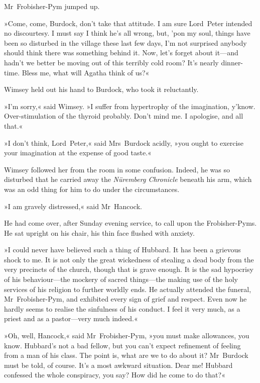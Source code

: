 Mr~Frobisher-Pym jumped up.

»Come, come, Burdock, don't take that attitude. I am sure Lord~Peter intended no discourtesy. I must say I think he's all wrong, but, 'pon my soul, things have been so disturbed in the village these last few days, I'm not surprised anybody should think there was something behind it. Now, let's forget about it—and hadn't we better be moving out of this terribly cold room? It's nearly dinner-time. Bless me, what will Agatha think of us?«

Wimsey held out his hand to Burdock, who took it reluctantly.

»I'm sorry,« said Wimsey. »I suffer from hypertrophy of the imagination, y'know. Over-stimulation of the thyroid probably. Don't mind me. I apologise, and all that.«

»I don't think, Lord~Peter,« said Mrs~Burdock acidly, »you ought to exercise your imagination at the expense of good taste.«

Wimsey followed her from the room in some confusion. Indeed, he was so disturbed that he carried away the \textit{Nüremberg Chronicle} beneath his arm, which was an odd thing for him to do under the circumstances.

\divider
»I am gravely distressed,« said Mr~Hancock.

He had come over, after Sunday evening service, to call upon the Frobisher-Pyms. He sat upright on his chair, his thin face flushed with anxiety.

»I could never have believed such a thing of Hubbard. It has been a grievous shock to me. It is not only the great wickedness of stealing a dead body from the very precincts of the church, though that is grave enough. It is the sad hypocrisy of his behaviour—the mockery of sacred things—the making use of the holy services of his religion to further worldly ends. He actually attended the funeral, Mr~Frobisher-Pym, and exhibited every sign of grief and respect. Even now he hardly seems to realise the sinfulness of his conduct. I feel it very much, as a priest and as a pastor—very much indeed.«

»Oh, well, Hancock,« said Mr~Frobisher-Pym, »you must make allowances, you know. Hubbard's not a bad fellow, but you can't expect refinement of feeling from a man of his class. The point is, what are we to do about it? Mr~Burdock must be told, of course. It's a most awkward situation. Dear me! Hubbard confessed the whole conspiracy, you say? How did he come to do that?«

